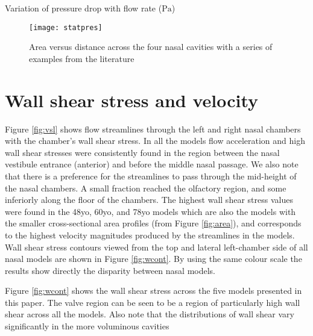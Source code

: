  \begin{table} 
    \centering

      \caption{Variation of pressure drop with flow rate ($\mathrm{Pa}$)}
  \label{tab:pvv}
\end{table}

\begin{figure} 
  \texttt{[image: statpres]}
  \caption{Area versus distance across the four nasal cavities with a series of examples from the literature}
  \label{fig:stpr}
\end{figure}

\section{Wall shear stress and velocity}
Figure \ref{fig:vsl} shows flow streamlines through the left and right nasal chambers with the chamber’s wall shear stress. In all the models flow acceleration and high wall shear stresses were consistently found in the region between the nasal vestibule entrance (anterior) and before the middle nasal passage. We also note that there is a preference for the streamlines to pass through the mid-height of the nasal chambers. A small fraction reached the olfactory region, and some inferiorly along the floor of the chambers. The highest wall shear stress values were found in the 48yo, 60yo, and 78yo models which are also the models with the smaller cross-sectional area profiles (from Figure \ref{fig:area}), and corresponds to the highest velocity magnitudes produced by the streamlines in the models. Wall shear stress contours viewed from the top and lateral left-chamber side of all nasal models are shown in Figure \ref{fig:wcont}. By using the same colour scale the results show directly the disparity between nasal models.

Figure \ref{fig:wcont} shows the wall shear stress across the five models presented in this paper. The valve region can be seen to be a region of particularly high wall shear across all the models. Also note that the distributions of wall shear vary significantly in the more voluminous cavities


